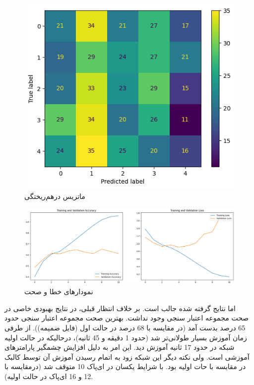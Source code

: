 \documentclass{article}
\begin{document}
\begin{figure}[!h]
    \centering\includegraphics[scale=.70]{./p4-2}
    \caption{ماتریس درهم‌ریختگی}\label{fig.42}
\end{figure}

\begin{figure}[!h]
    \centering\includegraphics[scale=.45]{./p4-3}
    \caption{نمودارهای خطا و صحت}\label{fig.43}
\end{figure}

\cleardoublepage

اما نتایج گرفته شده جالب است. بر خلاف انتظار قبلی، در نتایج بهبودی خاصی در صحت مجموعه اعتبار سنجی وجود نداشت. بهترین صحت مجموعه اعتبار سنجی حدود 65 درصد بدست آمد (در مقایسه با 68 درصد در حالت اول (فایل ضمیمه)). از طرفی زمان آموزش بسیار طولانی‌تر شد (حدود 1 دقیقه و 45 ثانیه)، درحالیکه در حالت اولیه شبکه در حدود 17 ثانیه آموزش دید. این امر به دلیل افزایش چشمگیر پارامترهای آموزشی است. ولی نکته دیگر این شبکه زود به اتمام رسیدن آموزش آن توسط کالبک در مقایسه با حات اولیه بود. با شرایط یکسان در ای‌پاک 10 متوقف شد (درمقایسه با 12 و 16 ای‌پاک در حالت اولیه).
\end{document}
